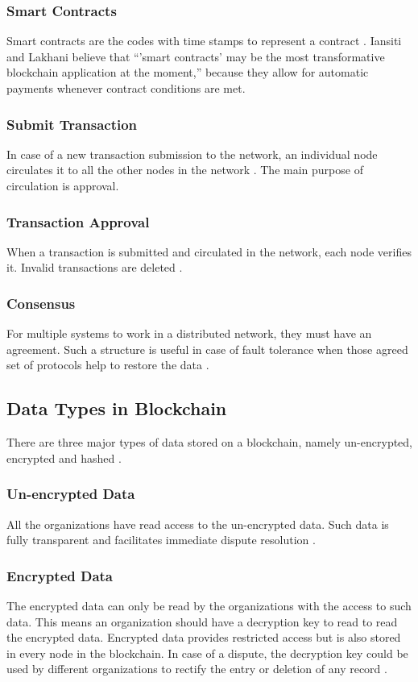 \documentclass[sigconf]{acmart}
\begin{document}
\subsubsection{Smart Contracts} Smart contracts are the codes with time stamps to represent a contract \cite{pabc1}. Iansiti and Lakhani \cite{hbr} believe that ``'smart contracts' may be the most transformative blockchain application at the moment,'' because they allow for automatic payments whenever contract conditions are met. 

\subsubsection{Submit Transaction} In case of a new transaction submission to the network, an individual node circulates it to all the other nodes in the network \cite{pabc1}. The main purpose of circulation is approval. 

\subsubsection{Transaction Approval} When a transaction is submitted and circulated in the network, each node verifies it. Invalid transactions are deleted \cite{pabc1}.

\subsubsection{Consensus} For multiple systems to work in a distributed network, they must have an agreement. Such a structure is useful in case of fault tolerance when those agreed set of protocols help to restore the data \cite{pabc1}.

\subsection{Data Types in Blockchain}
There are three major types of data stored on a blockchain, namely un-encrypted, encrypted and hashed \cite{arbc1}. 

\subsubsection{Un-encrypted Data} All the organizations have read access to the un-encrypted data. Such data is fully transparent and facilitates immediate dispute resolution \cite{arbc1}.

\subsubsection{Encrypted Data} The encrypted data can only be read by the organizations with the access to such data. This means an organization should have a decryption key to read to read the encrypted data. Encrypted data provides restricted access but is also stored in every node in the blockchain. In case of a dispute, the decryption key could be used by different organizations to rectify the entry or deletion of any record \cite{arbc1}.
\end{document}
